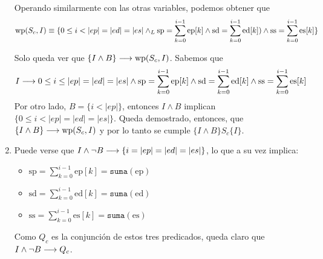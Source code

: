 \documentclass[10pt,a4paper]{article}
\newcommand{\predRef}{\texttt}
\newcommand{\var}{\text}
\renewcommand{\wp}{\text{wp}}
\begin{document}
\begin{enumerate}
    Operando similarmente con las otras variables, podemos obtener que
    $$\wp(S_c, I)\equiv \{0 \leq i < |ep| = |ed| = |es| \yLuego \var{sp} = \sum_{k=0}^{i-1}{\var{ep}[k]} \land \var{sd} = \sum_{k=0}^{i-1}{\var{ed}[k]}) \land \var{ss} = \sum_{k=0}^{i-1}{\var{es}[k]}\}$$

    Solo queda ver que $\{I \land B\} \implica \wp(S_c, I)$. Sabemos que
    $$I\implica 0 \leq i\leq |ep| = |ed| = |es|\land \var{sp} = \sum_{k=0}^{i-1}{\var{ep}[k]}\land \var{sd} = \sum_{k=0}^{i-1}{\var{ed}[k]}\land \var{ss} = \sum_{k=0}^{i-1}{\var{es}[k]}$$
    Por otro lado, $B = \{i < |ep|\}$, entonces $I\land B$ implican $\{0 \leq i < |ep| = |ed| = |es|\}$. Queda demostrado, entonces, que $\{I \land B\} \implica \wp(S_c, I)$ y por lo tanto se cumple $\{I\land B\}S_c\{I\}$.
    
    \item Puede verse que $I \land \neg B \longrightarrow \{i = |ep| = |ed| = |es|\}$, lo que a su vez implica:
        \begin{itemize}
            \item $\var{sp} = \sum_{k=0}^{i-1}{\var{ep}[k]} = \predRef{suma}(\var{ep})$
            \item $\var{sd} = \sum_{k=0}^{i-1}{\var{ed}[k]} = \predRef{suma}(\var{ed})$
            \item $\var{ss} = \sum_{k=0}^{i-1}{\var{es}[k]} = \predRef{suma}(\var{es})$
        \end{itemize}
    Como $Q_c$ es la conjunción de estos tres predicados, queda claro que $I \land \neg B \longrightarrow Q_c$.
\end{enumerate}
\end{document}
